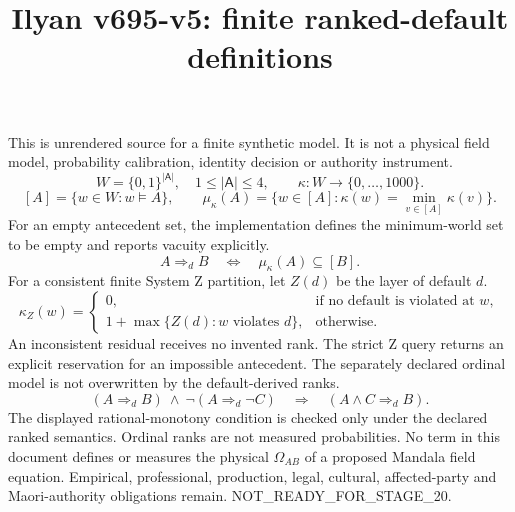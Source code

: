 \documentclass{article}
\begin{document}
\title{Ilyan v695-v5: finite ranked-default definitions}
\maketitle
This is unrendered source for a finite synthetic model. It is not a physical field model, probability calibration, identity decision or authority instrument.
\[
 W=\{0,1\}^{|\mathsf A|},\quad 1\leq |\mathsf A|\leq4,
 \qquad \kappa:W\longrightarrow\{0,\ldots,1000\}.
\]
\[
 [A]=\{w\in W:w\models A\},\qquad
 \mu_\kappa(A)=\{w\in[A]:\kappa(w)=\min_{v\in[A]}\kappa(v)\}.
\]
For an empty antecedent set, the implementation defines the minimum-world set to be empty and reports vacuity explicitly.
\[
 A\mathrel{\Rightarrow_d}B\quad\Longleftrightarrow\quad
 \mu_\kappa(A)\subseteq[B].
\]
For a consistent finite System Z partition, let $Z(d)$ be the layer of default $d$.
\[
 \kappa_Z(w)=
 \begin{cases}
 0,&\text{if no default is violated at }w,\\
 1+\max\{Z(d):w\text{ violates }d\},&\text{otherwise}.
 \end{cases}
\]
An inconsistent residual receives no invented rank. The strict Z query returns an explicit reservation for an impossible antecedent. The separately declared ordinal model is not overwritten by the default-derived ranks.
\[
 (A\Rightarrow_d B)\ \land\ \neg(A\Rightarrow_d\neg C)
 \quad\Longrightarrow\quad (A\land C\Rightarrow_d B).
\]
The displayed rational-monotony condition is checked only under the declared ranked semantics. Ordinal ranks are not measured probabilities. No term in this document defines or measures the physical $\Omega_{AB}$ of a proposed Mandala field equation. Empirical, professional, production, legal, cultural, affected-party and Maori-authority obligations remain. NOT\_READY\_FOR\_STAGE\_20.
\end{document}
